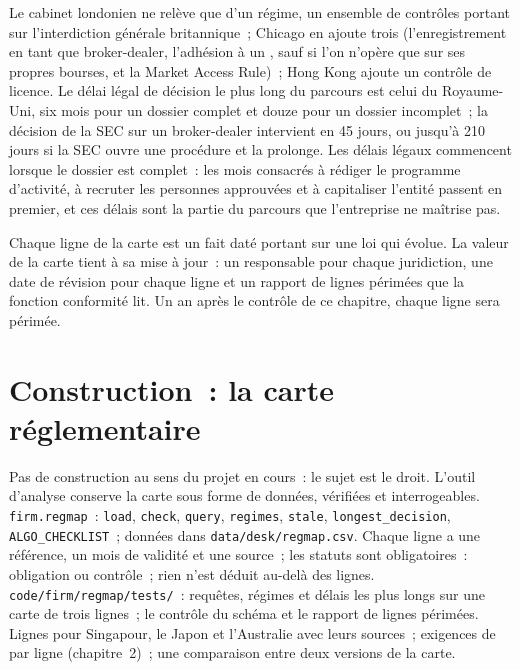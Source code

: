 Le cabinet londonien ne relève que d'un régime, un ensemble de contrôles portant sur l'interdiction générale britannique~; Chicago en ajoute trois (l'enregistrement en tant que broker-dealer, l'adhésion
à un , sauf si l'on n'opère que sur ses propres bourses, et la Market Access Rule)~; Hong Kong ajoute un contrôle de licence. Le délai légal de décision le plus long du parcours est
celui du Royaume-Uni, six mois pour un dossier complet et douze pour un dossier incomplet~; la décision de la SEC sur un broker-dealer intervient en 45 jours, ou jusqu'à 210 jours si
la SEC ouvre une procédure et la prolonge. Les délais légaux commencent lorsque le dossier est complet~: les mois consacrés à rédiger le programme d'activité, à recruter les personnes approuvées et à capitaliser
l'entité passent en premier, et ces délais sont la partie du parcours que l'entreprise ne maîtrise pas.

\begin{remark}\label{rem:fm:regulators-and-licences:upkeep}
Chaque ligne de la carte est un fait daté portant sur une loi qui évolue. La valeur de la carte tient à sa mise à jour~: un responsable pour chaque juridiction, une date de révision pour
chaque ligne et un rapport de lignes périmées que la fonction conformité lit. Un an après le contrôle de ce chapitre, chaque ligne sera périmée.
\end{remark}

\section{Construction~: la carte réglementaire}\label{bld:fm:regulators-and-licences:regmap}

\begin{build}
 Pas de construction au sens du projet en cours~: le sujet est le droit. L'outil d'analyse conserve la carte sous forme de données, vérifiées et interrogeables.
 \texttt{firm.regmap}~: \texttt{load}, \texttt{check}, \texttt{query}, \texttt{regimes}, \texttt{stale}, \texttt{longest\_decision},
\texttt{ALGO\_CHECKLIST}~; données dans \texttt{data/desk/regmap.csv}.
 Chaque ligne a une référence, un mois de validité et une source~; les statuts sont obligatoires~: obligation ou contrôle~; rien n'est déduit au-delà des
lignes.
 \texttt{code/firm/regmap/tests/}~: requêtes, régimes et délais les plus longs sur une carte de trois lignes~; le contrôle du schéma et le rapport de lignes
périmées.
 Lignes pour Singapour, le Japon et l'Australie avec leurs sources~; exigences de  par ligne (chapitre~2)~; une comparaison entre deux versions
de la carte.
\end{build}

